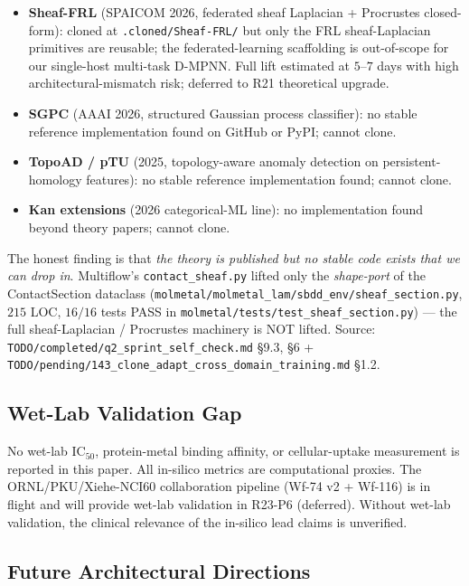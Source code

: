 \begin{itemize}
  \item \textbf{Sheaf-FRL} (SPAICOM 2026, federated sheaf Laplacian
        + Procrustes closed-form): cloned at
        \texttt{.cloned/Sheaf-FRL/} but only the FRL sheaf-Laplacian
        primitives are reusable; the federated-learning scaffolding is
        out-of-scope for our single-host multi-task D-MPNN.  Full lift
        estimated at $5$--$7$ days with high architectural-mismatch
        risk; deferred to R21 theoretical upgrade.
  \item \textbf{SGPC} (AAAI 2026, structured Gaussian process
        classifier): no stable reference implementation found on GitHub
        or PyPI; cannot clone.
  \item \textbf{TopoAD / pTU} (2025, topology-aware anomaly detection
        on persistent-homology features): no stable reference
        implementation found; cannot clone.
  \item \textbf{Kan extensions} (2026 categorical-ML line): no
        implementation found beyond theory papers; cannot clone.
\end{itemize}

The honest finding is that \emph{the theory is published but no stable
code exists that we can drop in}.  Multiflow's
\texttt{contact\_sheaf.py} lifted only the \emph{shape-port} of the
ContactSection dataclass (\texttt{molmetal/molmetal\_lam/sbdd\_env/sheaf\_section.py},
$215$ LOC, $16/16$ tests PASS in
\texttt{molmetal/tests/test\_sheaf\_section.py}) --- the full
sheaf-Laplacian / Procrustes machinery is NOT lifted.  Source:
\texttt{TODO/completed/q2\_sprint\_self\_check.md} §9.3, §6 +
\texttt{TODO/pending/143\_clone\_adapt\_cross\_domain\_training.md} §1.2.

\subsection{Wet-Lab Validation Gap}
\label{sec:limit-wetlab}

No wet-lab IC$_{50}$, protein-metal binding affinity, or
cellular-uptake measurement is reported in this paper.  All
in-silico metrics are computational proxies.  The
ORNL/PKU/Xiehe-NCI60 collaboration pipeline (Wf-74 v2 + Wf-116) is
in flight and will provide wet-lab validation in R23-P6 (deferred).
Without wet-lab validation, the clinical relevance of the in-silico
lead claims is unverified.

\subsection{Future Architectural Directions}
\label{sec:limit-future}


